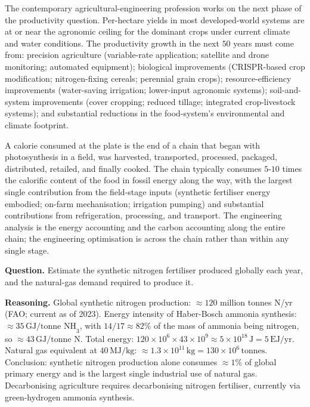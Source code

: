 The contemporary agricultural-engineering profession works on the next phase of the productivity question. Per-hectare yields in most developed-world systems are at or near the agronomic ceiling for the dominant crops under current climate and water conditions. The productivity growth in the next $50$ years must come from: precision agriculture (variable-rate application; satellite and drone monitoring; automated equipment); biological improvements (CRISPR-based crop modification; nitrogen-fixing cereals; perennial grain crops); resource-efficiency improvements (water-saving irrigation; lower-input agronomic systems); soil-and-system improvements (cover cropping; reduced tillage; integrated crop-livestock systems); and substantial reductions in the food-system's environmental and climate footprint.

\begin{archetype}
A calorie consumed at the plate is the end of a chain that began with photosynthesis in a field, was harvested, transported, processed, packaged, distributed, retailed, and finally cooked. The chain typically consumes $5$-$10$ times the calorific content of the food in fossil energy along the way, with the largest single contribution from the field-stage inputs (synthetic fertiliser energy embodied; on-farm mechanisation; irrigation pumping) and substantial contributions from refrigeration, processing, and transport. The engineering analysis is the energy accounting and the carbon accounting along the entire chain; the engineering optimisation is across the chain rather than within any single stage.
\end{archetype}

\begin{estimation}
\textbf{Question.} Estimate the synthetic nitrogen fertiliser produced globally each year, and the natural-gas demand required to produce it.

\textbf{Reasoning.} Global synthetic nitrogen production: $\approx 120$ million tonnes N/yr (FAO; current as of 2023). Energy intensity of Haber-Bosch ammonia synthesis: $\approx 35\,\text{GJ/tonne NH}_3$, with $14/17 \approx 82\%$ of the mass of ammonia being nitrogen, so $\approx 43\,\text{GJ/tonne N}$. Total energy: $120 \times 10^6 \times 43 \times 10^9 \approx 5 \times 10^{18}\,\text{J} = 5\,\text{EJ/yr}$. Natural gas equivalent at $40\,\text{MJ/kg}$: $\approx 1.3 \times 10^{11}\,\text{kg} = 130 \times 10^6\,\text{tonnes}$. Conclusion: synthetic nitrogen production alone consumes $\approx 1\%$ of global primary energy and is the largest single industrial use of natural gas. Decarbonising agriculture requires decarbonising nitrogen fertiliser, currently via green-hydrogen ammonia synthesis.
\end{estimation}

